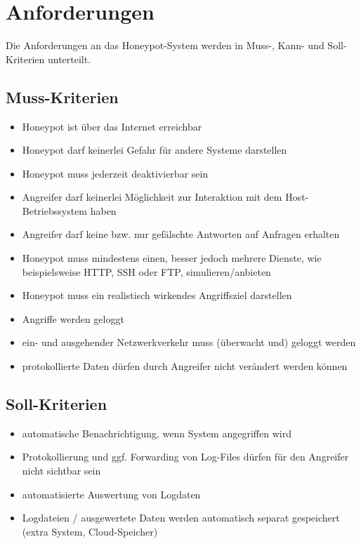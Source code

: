 \chapter{Anforderungen}
\label{sec:Anforderungen}

Die Anforderungen an das Honeypot-System werden in Muss-, Kann- und Soll-Kriterien unterteilt.


\section{Muss-Kriterien}
\label{subsec:Muss-Kriterien}
\begin{itemize}
\item Honeypot ist über das Internet erreichbar
\item Honeypot darf keinerlei Gefahr für andere Systeme darstellen
\item Honeypot muss jederzeit deaktivierbar sein
\item Angreifer darf keinerlei Möglichkeit zur Interaktion mit dem Host-Betriebssystem haben
\item Angreifer darf keine bzw. nur gefälschte Antworten auf Anfragen erhalten
\item Honeypot muss mindestens einen, besser jedoch mehrere Dienste, wie beispielsweise HTTP, SSH oder FTP, simulieren/anbieten
\item Honeypot muss ein realistisch wirkendes Angriffsziel darstellen
\item Angriffe werden geloggt
\item ein- und ausgehender Netzwerkverkehr muss (überwacht und) geloggt werden 
\item protokollierte Daten dürfen durch Angreifer nicht verändert werden können

\end{itemize}

\newpage

\section{Soll-Kriterien}
\label{subsec:Soll-Kriterien}
\begin{itemize}
\item automatische Benachrichtigung, wenn System angegriffen wird
\item Protokollierung und ggf. Forwarding von Log-Files dürfen für den Angreifer nicht sichtbar sein
\item automatisierte Auswertung von Logdaten
\item Logdateien / ausgewertete Daten werden automatisch separat gespeichert (extra System, Cloud-Speicher)
\end{itemize}


